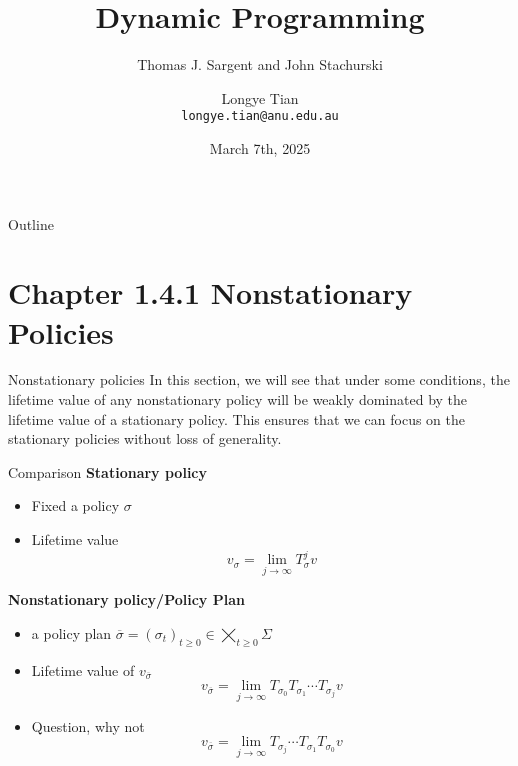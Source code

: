 \documentclass[aspectratio=169]{beamer} %
\title[DP2]{Dynamic Programming}
\subtitle{Thomas J. Sargent and John Stachurski}
\author[Longye]{Longye Tian \\ \texttt{longye.tian@anu.edu.au}}
\institute[ANU]{Australian National University\\ School of Economics}
\date{March 7th, 2025}
\begin{document}
\begin{frame}
  \titlepage
\end{frame}

\begin{frame}{Outline}
  \tableofcontents
\end{frame}

\section{Chapter 1.4.1 Nonstationary Policies}
\begin{frame}{Nonstationary policies}
In this section, we will see that under some conditions, the lifetime value of any nonstationary policy will be weakly dominated by the lifetime value of a stationary policy. This ensures that we can focus on the stationary policies without loss of generality.
    
\end{frame}
\begin{frame}{Comparison}
\textbf{Stationary policy}
\begin{itemize}
    \item Fixed a policy $\sigma$
    \item Lifetime value 
    $$
    v_\sigma = \lim_{j\to\infty} T^j_\sigma v
    $$
\end{itemize}
\textbf{Nonstationary policy/Policy Plan}
\begin{itemize}
    \item a policy plan $\overline{\sigma} = (\sigma_t)_{t\ge 0}\in \bigtimes_{t\ge0} \Sigma$
    \item Lifetime value of $v_{\overline{\sigma}}$
    $$
    v_{\overline{\sigma}} = \lim_{j\to\infty} T_{\sigma_0}T_{\sigma_1}\cdots T_{\sigma_j} v
    $$
    \item Question, why not
    $$
     v_{\overline{\sigma}} = \lim_{j\to\infty} T_{\sigma_j}\cdots T_{\sigma_1} T_{\sigma_0} v
    $$
\end{itemize}
\end{frame}
\end{document}
